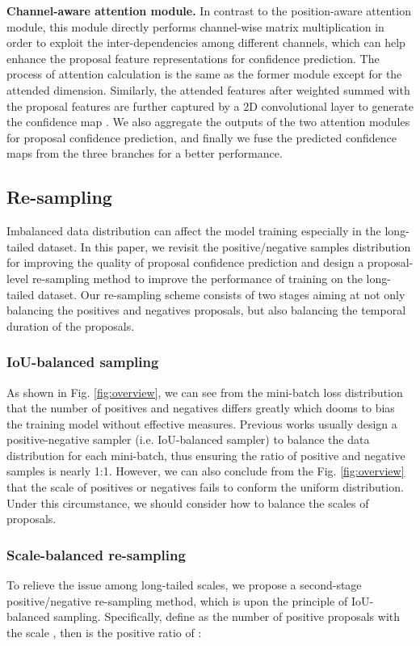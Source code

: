 \documentclass[letterpaper]{article} \usepackage{aaai21}  \usepackage{times}  \usepackage{helvet} \usepackage{courier}  \usepackage[hyphens]{url}  \usepackage{graphicx} \urlstyle{rm} \def\UrlFont{\rm}  \usepackage{natbib}  \usepackage{amsmath,amssymb} \usepackage{caption} \frenchspacing  \usepackage{color}
\begin{document}
\textbf{Channel-aware attention module.} In contrast to the position-aware attention module, this module directly performs channel-wise matrix multiplication in order to exploit the inter-dependencies among different channels, which can help enhance the proposal feature representations for confidence prediction. The process of attention calculation is the same as the former module except for the attended dimension. Similarly, the attended features after weighted summed with the proposal features are further captured by a 2D convolutional layer to generate the confidence map . We also aggregate the outputs of the two attention modules for proposal confidence prediction, and finally we fuse the predicted confidence maps from the three branches for a better performance.





 
\subsection{Re-sampling}

Imbalanced data distribution can affect the model training especially in the long-tailed dataset. In this paper, we revisit the positive/negative samples distribution for improving the quality of proposal confidence prediction and design a proposal-level re-sampling method to improve the performance of training on the long-tailed dataset. Our re-sampling scheme consists of two stages aiming at not only balancing the positives and negatives proposals, but also balancing the temporal duration of the proposals.
\subsubsection{IoU-balanced sampling} As shown in Fig. \ref{fig:overview}, we can see from the mini-batch loss distribution that the number of positives and negatives differs greatly which dooms to bias the training model without effective measures. Previous works usually design a positive-negative sampler (i.e. IoU-balanced sampler) to balance the data distribution for each mini-batch, thus ensuring the ratio of positive and negative samples is nearly 1:1. However, we can also conclude from the Fig. \ref{fig:overview} that the scale of positives or negatives fails to conform the uniform distribution. Under this circumstance, we should consider how to balance the scales of proposals.
\subsubsection{Scale-balanced re-sampling} To relieve the issue among long-tailed scales, we propose a second-stage positive/negative re-sampling method, which is upon the principle of IoU-balanced sampling. Specifically, define  as the number of positive proposals with the scale , then  is the positive ratio of :
\end{document}
